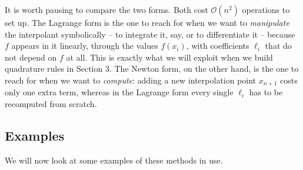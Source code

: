 \documentclass[a4paper]{scrartcl}
\begin{document}
It is worth pausing to compare the two forms. Both cost $\mathcal{O}(n^2)$ operations to set up. The Lagrange form is the one to reach for when we want to \emph{manipulate} the interpolant symbolically -- to integrate it, say, or to differentiate it -- because $f$ appears in it linearly, through the values $f(x_i)$, with coefficients $\ell_i$ that do not depend on $f$ at all. This is exactly what we will exploit when we build quadrature rules in Section 3. The Newton form, on the other hand, is the one to reach for when we want to \emph{compute}: adding a new interpolation point $x_{n+1}$ costs only one extra term, whereas in the Lagrange form every single $\ell_i$ has to be recomputed from scratch.

\subsection{Examples}

We will now look at some examples of these methods in use.
\end{document}
